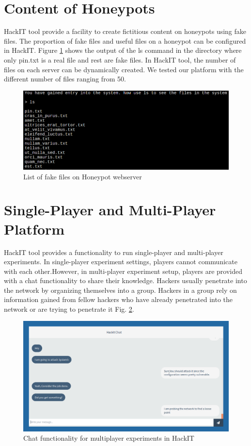 \section{Content of Honeypots}
HackIT tool provide a facility to create fictitious content on honeypots using fake files. The proportion of fake files and useful files on a honeypot can be configured in HackIT. Figure \ref{fig:figure5} shows the output of the ls command in the directory where only pin.txt is a real file and rest are fake files. In HackIT tool, the number of files on each server can be dynamically created. We tested our platform with the different number of files ranging from 50.
\FloatBarrier
\begin{figure}[!htbp]
\centering
  \includegraphics[scale=0.5]{Chap2/files.png}
  \caption{List of fake files on Honeypot webserver}\label{fig:figure5}
\end{figure} 
\section{Single-Player and Multi-Player Platform}
HackIT tool provides a functionality to run single-player and multi-player experiments.
In single-player experiment settings, players cannot communicate with each other.However, in multi-player experiment setup, players are provided with a chat functionality to share their knowledge. Hackers usually penetrate into the network by
organizing themselves into a group. Hackers in a group rely on information gained
from fellow hackers who have already penetrated into the network or are trying to
penetrate it Fig. \ref{fig:figure6}.
\FloatBarrier
\begin{figure}[!htbp]
\centering
  \includegraphics[scale=0.4]{Chap2/chat.png}
  \caption{Chat functionality for multiplayer experiments in HackIT}\label{fig:figure6}
\end{figure} 

